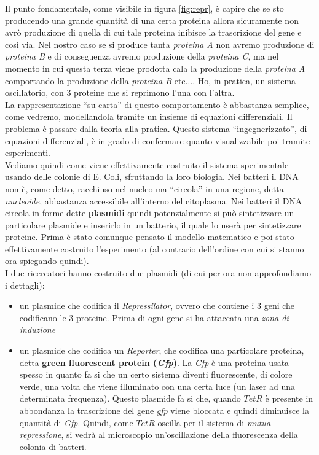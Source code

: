 \documentclass[a4paper,12pt, oneside]{book}
\begin{document}
Il punto fondamentale, come visibile in figura \ref{fig:repr}, è capire che se
sto producendo una grande quantità di una 
certa proteina allora sicuramente non avrò produzione di quella di cui
tale proteina inibisce la trascrizione del gene e così via. Nel nostro caso se
si produce tanta \textit{proteina A} non avremo produzione di \textit{proteina
  B} e di conseguenza avremo produzione della \textit{proteina C}, ma nel
momento in cui questa terza viene prodotta cala la produzione della
\textit{proteina A} comportando la produzione della \textit{proteina B}
etc$\ldots$. Ho, in pratica, un sistema oscillatorio, con 3 proteine che si
reprimono l'una con l'altra.\\
La rappresentazione ``su carta'' di questo comportamento è abbastanza semplice,
come vedremo, modellandola tramite un insieme di equazioni differenziali. Il
problema è passare dalla teoria alla pratica. Questo sistema ``ingegnerizzato'',
di equazioni differenziali, è in grado di confermare quanto visualizzabile poi
tramite esperimenti. \\ 
Vediamo quindi come viene effettivamente costruito il sistema sperimentale
usando delle colonie di E. Coli, sfruttando la loro biologia. Nei batteri il DNA
non è, come detto, racchiuso nel nucleo ma ``circola'' in una regione, detta
\textit{nucleoide}, abbastanza accessibile all'interno del citoplasma. Nei
batteri il DNA circola in forme dette \textbf{plasmidi} quindi potenzialmente si
può sintetizzare un particolare plasmide e inserirlo in un batterio, il quale lo
userà per sintetizzare proteine. Prima è stato comunque pensato il modello
matematico e poi stato effettivamente costruito l'esperimento (al contrario
dell'ordine con cui si stanno ora spiegando quindi). \\
I due ricercatori hanno costruito due plasmidi (di cui per ora non approfondiamo
i dettagli):
\begin{itemize}
  \item un plasmide che codifica il\textit{ Repressilator}, ovvero che contiene
  i 3 geni che codificano le 3 proteine. Prima di ogni gene si ha attaccata una
  \textit{zona di induzione} 
  \item un plasmide che codifica un \textit{Reporter}, che codifica una
  particolare proteina, detta \textbf{green fluorescent protein
    (\textit{Gfp})}. La \textit{Gfp} è una proteina usata spesso in quanto fa si
  che un certo sistema diventi fluorescente, di colore verde, una volta che
  viene illuminato con una certa luce (un laser ad una determinata
  frequenza). Questo plasmide fa si che, quando $TetR$ è presente in abbondanza
  la trascrizione del gene \textit{gfp} viene bloccata e quindi diminuisce la
  quantità di \textit{Gfp}. Quindi, come $TetR$ oscilla per il sistema di
  \textit{mutua repressione}, si vedrà al microscopio un'oscillazione della
  fluorescenza della colonia di batteri. 
\end{itemize}
\end{document}
